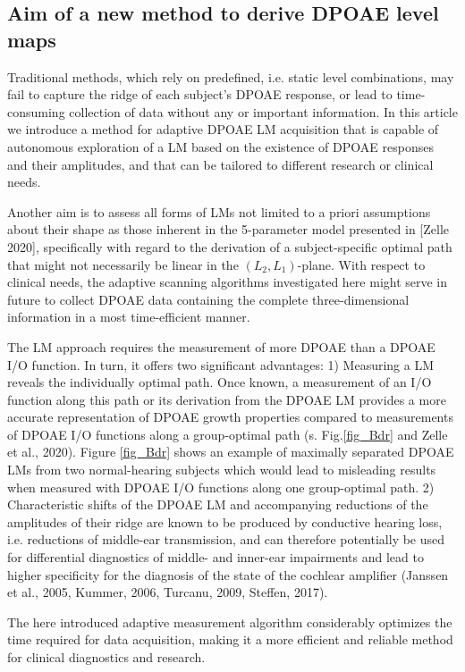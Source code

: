 \documentclass[journal,twoside,web]{ieeecolor2}
\begin{document}
\subsection{Aim of a new method to derive DPOAE level maps}
Traditional methods, which rely on predefined, i.e.
static level combinations, may fail to capture the ridge of each subject’s DPOAE response, or lead to time-consuming collection of data without any or important information.
In this article we introduce a method for adaptive DPOAE LM acquisition that is capable of autonomous exploration of a LM based on the existence of DPOAE responses and their amplitudes, and that can be tailored to different research or clinical needs.

Another aim is to assess all forms of LMs not limited to a priori assumptions about their shape as those inherent in the 5-parameter model presented in [Zelle 2020], specifically with regard to the derivation of a subject-specific optimal path that might not necessarily be linear in the $(L_2, L_1)$-plane.
With respect to clinical needs, the adaptive scanning algorithms investigated here might serve in future to collect DPOAE data containing the complete three-dimensional information in a most time-efficient manner.

The LM approach requires the measurement of more DPOAE than a DPOAE I/O function.
In turn, it offers two significant advantages: 1) Measuring a LM reveals the individually optimal path.
Once known, a measurement of an I/O function along this path or its derivation from the DPOAE LM provides a more accurate representation of DPOAE growth properties compared to measurements of DPOAE I/O functions along a group-optimal path (s. Fig.\ref{fig_Bdr} and Zelle et al., 2020).
Figure \ref{fig_Bdr} shows an example of maximally separated DPOAE LMs from two normal-hearing subjects which would lead to misleading results when measured with DPOAE I/O functions along one group-optimal path.
2) Characteristic shifts of the DPOAE LM and accompanying reductions of the amplitudes of their ridge are known to be produced by conductive hearing loss, i.e.
reductions of middle-ear transmission, and can therefore potentially be used for differential diagnostics of middle- and inner-ear impairments and lead to higher specificity for the diagnosis of the state of the cochlear amplifier (Janssen et al., 2005, Kummer, 2006, Turcanu, 2009, Steffen, 2017).

The here introduced adaptive measurement algorithm considerably optimizes the time required for data acquisition, making it a more efficient and reliable method for clinical diagnostics and research.
\end{document}

